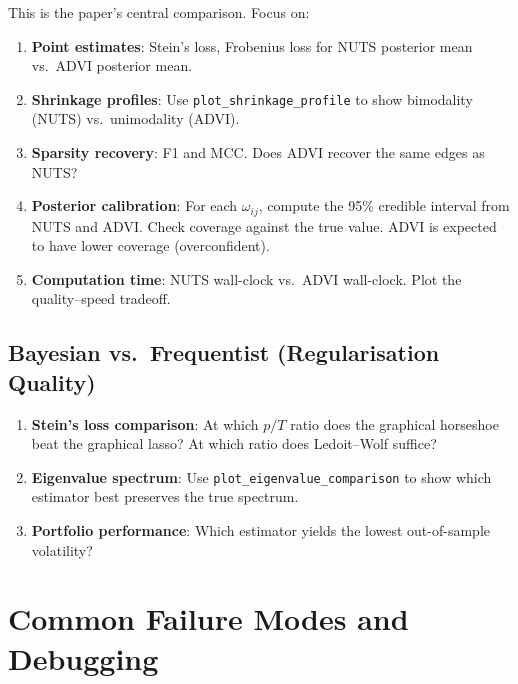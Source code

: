 \documentclass[11pt,a4paper]{article}
\begin{document}
This is the paper's central comparison. Focus on:
\begin{enumerate}[nosep]
  \item \textbf{Point estimates}: Stein's loss, Frobenius loss for NUTS posterior mean vs.\ ADVI posterior mean.
  \item \textbf{Shrinkage profiles}: Use \texttt{plot\_shrinkage\_profile} to show bimodality (NUTS) vs.\ unimodality (ADVI).
  \item \textbf{Sparsity recovery}: F1 and MCC. Does ADVI recover the same edges as NUTS?
  \item \textbf{Posterior calibration}: For each $\omega_{ij}$, compute the 95\% credible interval from NUTS and ADVI. Check coverage against the true value. ADVI is expected to have lower coverage (overconfident).
  \item \textbf{Computation time}: NUTS wall-clock vs.\ ADVI wall-clock. Plot the quality--speed tradeoff.
\end{enumerate}

\subsection{Bayesian vs.\ Frequentist (Regularisation Quality)}

\begin{enumerate}[nosep]
  \item \textbf{Stein's loss comparison}: At which $p/T$ ratio does the graphical horseshoe beat the graphical lasso? At which ratio does Ledoit--Wolf suffice?
  \item \textbf{Eigenvalue spectrum}: Use \texttt{plot\_eigenvalue\_comparison} to show which estimator best preserves the true spectrum.
  \item \textbf{Portfolio performance}: Which estimator yields the lowest out-of-sample volatility?
\end{enumerate}

\section{Common Failure Modes and Debugging}
\end{document}
